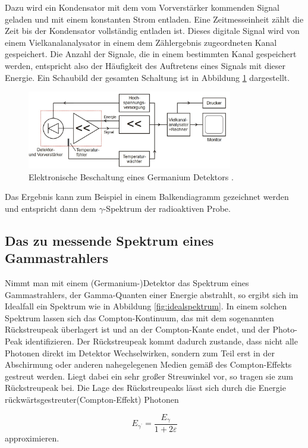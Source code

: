 Dazu wird ein Kondensator mit dem vom Vorverstärker kommenden Signal geladen und mit einem konstanten Strom entladen.
Eine Zeitmesseinheit zählt die Zeit bis der Kondensator vollständig entladen ist.
Dieses digitale Signal wird von einem Vielkanalanalysator in einem dem Zählergebnis zugeordneten Kanal gespeichert.
Die Anzahl der Signale, die in einem bestimmten Kanal gespeichert werden, entspricht also der Häufigkeit des Auftretens eines Signals mit dieser Energie.
Ein Schaubild der gesamten Schaltung ist in Abbildung \ref{fig:t:3} dargestellt.
\begin{figure}
\centering
\includegraphics[width=0.8\textwidth]{content/skizzen/aufbau4.jpg}
\caption{Elektronische Beschaltung eines Germanium Detektors \cite{sample}.}
\label{fig:t:3}
\end{figure}
Das Ergebnis kann zum Beispiel in einem Balkendiagramm gezeichnet werden und entspricht dann dem $\gamma$-Spektrum der radioaktiven Probe.


\subsection{Das zu messende Spektrum eines Gammastrahlers}
\label{subsec:spektrum}

Nimmt man mit einem (Germanium-)Detektor das Spektrum eines Gammastrahlers, der Gamma-Quanten einer Energie abstrahlt,
so ergibt sich im Idealfall ein Spektrum wie in Abbildung \ref{fig:idealspektrum}. In einem solchen Spektrum lassen
sich das Compton-Kontinuum, das mit dem sogenannten Rückstreupeak überlagert ist und an der Compton-Kante endet, und der Photo-Peak identifizieren.
Der Rückstreupeak kommt dadurch zustande, dass nicht alle Photonen direkt im Detektor Wechselwirken, sondern zum Teil
erst in der Abschirmung oder anderen nahegelegenen Medien  gemäß des Compton-Effekts gestreut werden. Liegt dabei
ein sehr großer Streuwinkel vor, so tragen sie zum Rückstreupeak bei. Die Lage des Rückstreupeaks lässt sich durch
die Energie rückwärtsgestreuter(Compton-Effekt) Photonen

\begin{equation}
  \label{eqn:rstreupos}
  E_{\gamma^\text{'}} = \frac{E_{\gamma}}{1 + 2\varepsilon}
\end{equation}
approximieren.\\ \\


